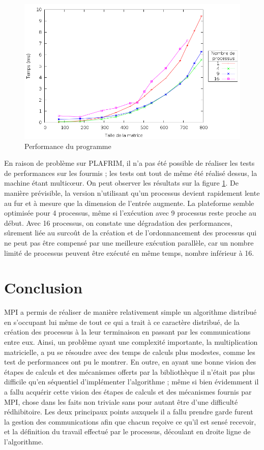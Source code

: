 \documentclass[a4paper,11pt]{article}
\begin{document}
\begin{figure}[h!]
  \centering
  \includegraphics[width=\textwidth]{plot.png}
  \caption{Performance du programme}
  \label{perf}
\end{figure}

En raison de problème sur PLAFRIM, il n'a pas été possible de réaliser les tests de performances sur les fourmis ; les tests ont tout de même été réalisé dessus, la machine étant multicœur. On peut observer les résultats sur la figure \ref{perf}. De manière prévisible, la version n'utilisant qu'un processus devient rapidement lente au fur et à mesure que la dimension de l'entrée augmente. La plateforme semble optimisée pour 4 processus, même si l'exécution avec 9 processus reste proche au début. Avec 16 processus, on constate une dégradation des performances, sûrement liée au surcoût de la création et de l'ordonnancement des processus qui ne peut pas être compensé par une meilleure exécution parallèle, car un nombre limité de processus peuvent être exécuté en même temps, nombre inférieur à 16.
\section{Conclusion}

MPI a permis de réaliser de manière relativement simple un algorithme distribué en s'occupant lui même de tout ce qui a trait à ce caractère distribué, de la création des processus à la leur terminaison en passant par les communications entre eux. Ainsi, un problème ayant une complexité importante, la multiplication matricielle, a pu se résoudre avec des temps de calculs plus modestes, comme les test de performances ont pu le montrer. En outre, en ayant une bonne vision des étapes de calculs et des mécanismes offerts par la bibliothèque il n'était pas plus difficile qu'en séquentiel d'implémenter l'algorithme ; même si bien évidemment il a fallu acquérir cette vision des étapes de calculs et des mécanismes fournis par MPI, chose dans les faits non triviale sans pour autant être d'une difficulté rédhibitoire. Les deux principaux points auxquels il a fallu prendre garde furent la gestion des communications afin que chacun reçoive ce qu'il est sensé recevoir, et la définition du travail effectué par le processus, découlant en droite ligne de l'algorithme.
\end{document}
